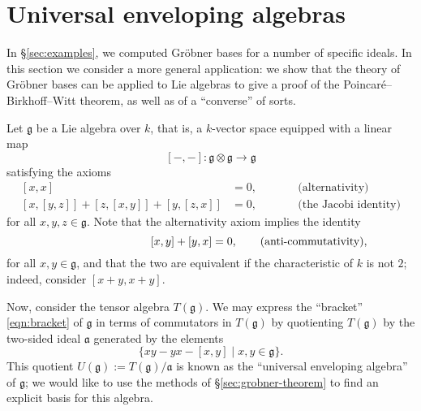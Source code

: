 \newcommand{\g}{\mathfrak{g}}
\renewcommand{\a}{\mathfrak{a}}
\newcommand{\Sym}{\operatorname{Sym}}

\section{Universal enveloping algebras}\label{sec:applications}

In \S\ref{sec:examples}, we computed Gr\"obner bases for a number of specific ideals. In this section we consider a more general application: we show that the theory of Gr\"obner bases can be applied to Lie algebras to give a proof of the Poincar\'e--Birkhoff--Witt theorem, as well as of a ``converse'' of sorts.

Let $\g$ be a Lie algebra over $k$, that is, a $k$-vector space equipped with a linear map
\begin{equation}
\label{eqn:bracket}
[-,-]\colon\g\otimes\g\to\g
\end{equation}
satisfying the axioms
\begin{equation*}
\begin{aligned}
[x,x]&=0,\\
[x,[y,z]]+[z,[x,y]]+[y,[z,x]]&=0,
\end{aligned}
\qquad
\begin{aligned}
&\text{(alternativity)}\\
&\text{(the Jacobi identity)}
\end{aligned}
\end{equation*}
for all $x,y,z\in\g$. Note that the alternativity axiom implies the identity
\begin{equation}
\hspace{8.5em}[x,y]+[y,x]=0,\qquad\text{(anti-commutativity)},
\end{equation}
for all $x,y\in\g$, and that the two are equivalent if the characteristic of $k$ is not $2$; indeed, consider $[x+y,x+y]$.

Now, consider the tensor algebra $T(\g)$. We may express the ``bracket'' \eqref{eqn:bracket} of $\g$ in terms of commutators in $T(\g)$ by quotienting $T(\g)$ by the two-sided ideal $\a$ generated by the elements
\begin{equation}
\label{eqn:ueaideal}
\{xy-yx-[x,y]\mid x,y\in\g\}.
\end{equation}
This quotient $U(\g):=T(\g)/\a$ is known as the ``universal enveloping algebra'' of $\g$; we would like to use the methods of \S\ref{sec:grobner-theorem} to find an explicit basis for this algebra.

